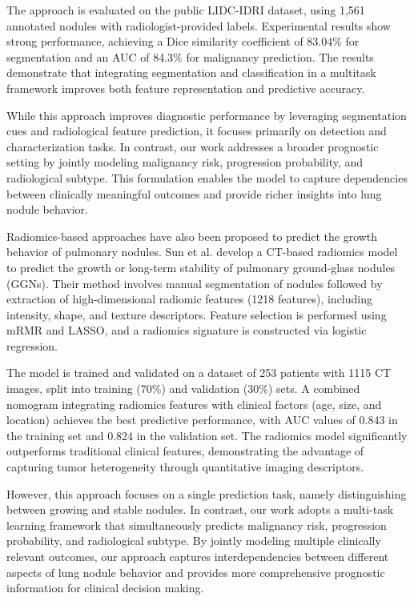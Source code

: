 The approach is evaluated on the public LIDC-IDRI dataset, using 1,561 annotated nodules with radiologist-provided labels. Experimental results show strong performance, achieving a Dice similarity coefficient of 83.04\% for segmentation and an AUC of 84.3\% for malignancy prediction. The results demonstrate that integrating segmentation and classification in a multitask framework improves both feature representation and predictive accuracy.

While this approach improves diagnostic performance by leveraging segmentation cues and radiological feature prediction, it focuses primarily on detection and characterization tasks. In contrast, our work addresses a broader prognostic setting by jointly modeling malignancy risk, progression probability, and radiological subtype. This formulation enables the model to capture dependencies between clinically meaningful outcomes and provide richer insights into lung nodule behavior.

\vspace{0.5cm}

Radiomics-based approaches have also been proposed to predict the growth behavior of pulmonary nodules. Sun et al.\cite{SUN2023110684} develop a CT-based radiomics model to predict the growth or long-term stability of pulmonary ground-glass nodules (GGNs). Their method involves manual segmentation of nodules followed by extraction of high-dimensional radiomic features (1218 features), including intensity, shape, and texture descriptors. Feature selection is performed using mRMR and LASSO, and a radiomics signature is constructed via logistic regression.

The model is trained and validated on a dataset of 253 patients with 1115 CT images, split into training (70\%) and validation (30\%) sets. A combined nomogram integrating radiomics features with clinical factors (age, size, and location) achieves the best predictive performance, with AUC values of 0.843 in the training set and 0.824 in the validation set. The radiomics model significantly outperforms traditional clinical features, demonstrating the advantage of capturing tumor heterogeneity through quantitative imaging descriptors.

However, this approach focuses on a single prediction task, namely distinguishing between growing and stable nodules. In contrast, our work adopts a multi-task learning framework that simultaneously predicts malignancy risk, progression probability, and radiological subtype. By jointly modeling multiple clinically relevant outcomes, our approach captures interdependencies between different aspects of lung nodule behavior and provides more comprehensive prognostic information for clinical decision making.


